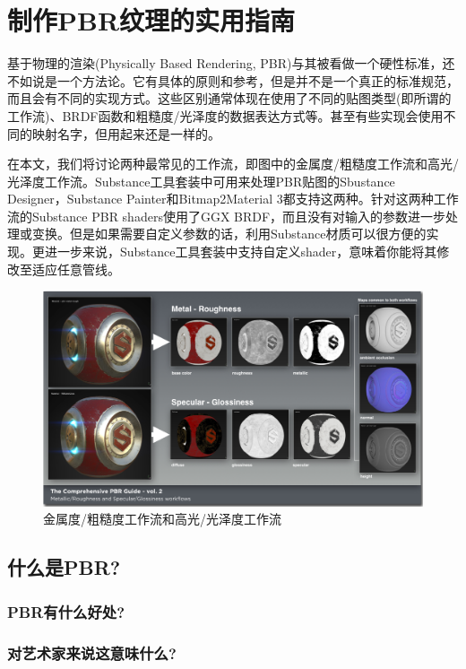\chapter{制作PBR纹理的实用指南}

基于物理的渲染(Physically Based Rendering, PBR)与其被看做一个硬性标准，还不如说是一个方法论。它有具体的原则和参考，但是并不是一个真正的标准规范，而且会有不同的实现方式。这些区别通常体现在使用了不同的贴图类型(即所谓的工作流)、BRDF函数和粗糙度/光泽度的数据表达方式等。甚至有些实现会使用不同的映射名字，但用起来还是一样的。

在本文，我们将讨论两种最常见的工作流，即图中的金属度/粗糙度工作流和高光/光泽度工作流。Substance工具套装中可用来处理PBR贴图的Sbustance Designer，Substance Painter和Bitmap2Material 3都支持这两种。针对这两种工作流的Substance PBR shaders使用了GGX BRDF，而且没有对输入的参数进一步处理或变换。但是如果需要自定义参数的话，利用Substance材质可以很方便的实现。更进一步来说，Substance工具套装中支持自定义shader，意味着你能将其修改至适应任意管线。

\begin{figure}[ht]
    \centering
	\includegraphics[width=\textwidth]{images/chap2_1.png}
	\caption{金属度/粗糙度工作流和高光/光泽度工作流}
    \label{fig:chap2_1}
\end{figure}

\section{什么是PBR?}

\subsection{PBR有什么好处?}

\subsection{对艺术家来说这意味什么?}


